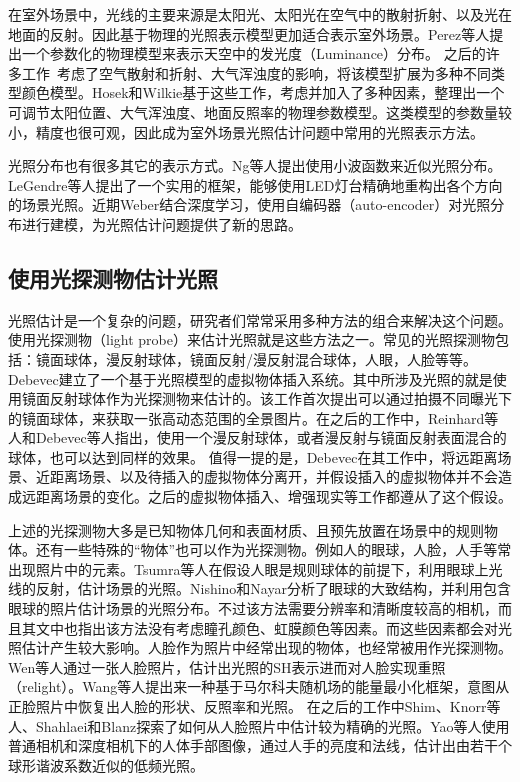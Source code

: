 在室外场景中，光线的主要来源是太阳光、太阳光在空气中的散射折射、以及光在地面的反射。因此基于物理的光照表示模型更加适合表示室外场景。Perez等人\cite{perez1993all}提出一个参数化的物理模型来表示天空中的发光度（Luminance）分布。
之后的许多工作~\cite{nishita1996display, sirai1993display, preetham1999practical,raab2008unbiased}考虑了空气散射和折射、大气浑浊度的影响，将该模型扩展为多种不同类型颜色模型。Hosek和Wilkie\cite{hosek2012analytic, hovsekhovsek2013adding}基于这些工作，考虑并加入了多种因素，整理出一个可调节太阳位置、大气浑浊度、地面反照率的物理参数模型。这类模型的参数量较小，精度也很可观，因此成为室外场景光照估计问题中常用的光照表示方法。

光照分布也有很多其它的表示方式。Ng等人\cite{ng2003all}提出使用小波函数来近似光照分布。LeGendre等人\cite{legendre2016practical}提出了一个实用的框架，能够使用LED灯台精确地重构出各个方向的场景光照。近期Weber\cite{weber2018learning}结合深度学习，使用自编码器（auto-encoder）对光照分布进行建模，为光照估计问题提供了新的思路。

\subsection{使用光探测物估计光照} 
光照估计是一个复杂的问题，研究者们常常采用多种方法的组合来解决这个问题。使用光探测物（light probe）来估计光照就是这些方法之一。常见的光照探测物包括：镜面球体，漫反射球体，镜面反射/漫反射混合球体，人眼，人脸等等。Debevec\cite{debevec1998rendering}建立了一个基于光照模型的虚拟物体插入系统。其中所涉及光照的就是使用镜面反射球体作为光探测物来估计的。该工作首次提出可以通过拍摄不同曝光下的镜面球体，来获取一张高动态范围的全景图片。在之后的工作中，Reinhard等人\cite{reinhard2005high}和Debevec等人\cite{debevec2012single}指出，使用一个漫反射球体，或者漫反射与镜面反射表面混合的球体，也可以达到同样的效果。 值得一提的是，Debevec在其工作\cite{debevec1998rendering}中，将远距离场景、近距离场景、以及待插入的虚拟物体分离开，并假设插入的虚拟物体并不会造成远距离场景的变化。之后的虚拟物体插入、增强现实等工作都遵从了这个假设。

上述的光探测物大多是已知物体几何和表面材质、且预先放置在场景中的规则物体。还有一些特殊的“物体”也可以作为光探测物。例如人的眼球，人脸，人手等常出现照片中的元素。Tsumra等人\cite{tsumura2003estimating}在假设人眼是规则球体的前提下，利用眼球上光线的反射，估计场景的光照。Nishino和Nayar\cite{nishino2004eyes}分析了眼球的大致结构，并利用包含眼球的照片估计场景的光照分布。不过该方法需要分辨率和清晰度较高的相机，而且其文中也指出该方法没有考虑瞳孔颜色、虹膜颜色等因素。而这些因素都会对光照估计产生较大影响。人脸作为照片中经常出现的物体，也经常被用作光探测物。
Wen等人\cite{wen2003face}通过一张人脸照片，估计出光照的SH表示进而对人脸实现重照（relight）。Wang等人\cite{wang2007face}提出来一种基于马尔科夫随机场的能量最小化框架，意图从正脸照片中恢复出人脸的形状、反照率和光照。   
在之后的工作中Shim\cite{shim2012faces}、Knorr等人\cite{knorr2014real}、Shahlaei和Blanz\cite{shahlaei2015realistic}探索了如何从人脸照片中估计较为精确的光照。Yao等人\cite{yao2013hand}使用普通相机和深度相机下的人体手部图像，通过人手的亮度和法线，估计出由若干个球形谐波系数近似的低频光照。

